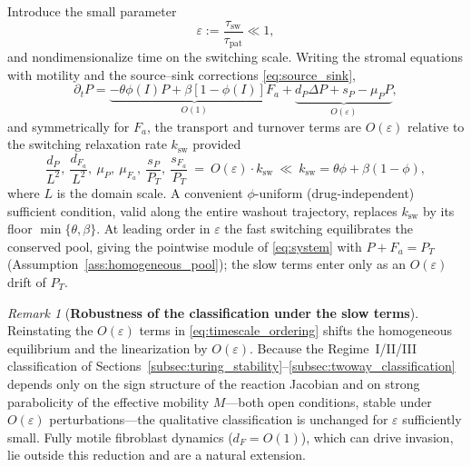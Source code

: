 \documentclass[pdflatex,sn-mathphys-ay]{sn-jnl}
\theoremstyle{thmstyleone}
\theoremstyle{definition}
\theoremstyle{remark}
\newtheorem{remark}[theorem]{Remark}
\begin{document}
Introduce the small parameter
\[
\varepsilon:=\frac{\tau_{\mathrm{sw}}}{\tau_{\mathrm{pat}}}\ll 1,
\]
and nondimensionalize time on the switching scale. Writing the stromal equations
with motility and the source--sink corrections \eqref{eq:source_sink},
\[
\partial_t P = \underbrace{-\theta\phi(I)P+\beta[1-\phi(I)]F_a}_{O(1)}
+\underbrace{d_P\Delta P + s_P-\mu_P P}_{O(\varepsilon)},
\]
and symmetrically for $F_a$, the transport and turnover terms are $O(\varepsilon)$
relative to the switching relaxation rate $k_{\mathrm{sw}}$ provided
\begin{equation}
\label{eq:timescale_ordering}
\frac{d_P}{L^2},\ \frac{d_{F_a}}{L^2},\ \mu_P,\ \mu_{F_a},\
\frac{s_P}{P_T},\ \frac{s_{F_a}}{P_T}
\ =\ O(\varepsilon)\cdot k_{\mathrm{sw}}
\ \ll\ k_{\mathrm{sw}}=\theta\phi+\beta(1-\phi),
\end{equation}
where $L$ is the domain scale. A convenient $\phi$-uniform (drug-independent)
sufficient condition, valid along the entire washout trajectory, replaces
$k_{\mathrm{sw}}$ by its floor $\min\{\theta,\beta\}$. At leading order in
$\varepsilon$ the fast switching equilibrates the conserved pool, giving the
pointwise module of \eqref{eq:system} with $P+F_a=P_T$
(Assumption~\ref{ass:homogeneous_pool}); the slow terms enter only as an
$O(\varepsilon)$ drift of $P_T$.

\begin{remark}[\textbf{Robustness of the classification under the slow terms}]
\label{rmk:slow_robustness}
Reinstating the $O(\varepsilon)$ terms in \eqref{eq:timescale_ordering} shifts the
homogeneous equilibrium and the linearization by $O(\varepsilon)$. Because the
Regime~I/II/III classification of
Sections~\ref{subsec:turing_stability}--\ref{subsec:twoway_classification}
depends only on the sign structure of the reaction Jacobian and on strong
parabolicity of the effective mobility $M$---both open conditions, stable under
$O(\varepsilon)$ perturbations---the qualitative classification is unchanged for
$\varepsilon$ sufficiently small. Fully motile fibroblast dynamics
($d_F=O(1)$), which can drive invasion, lie outside this reduction and are a
natural extension.
\end{remark}
\end{document}
